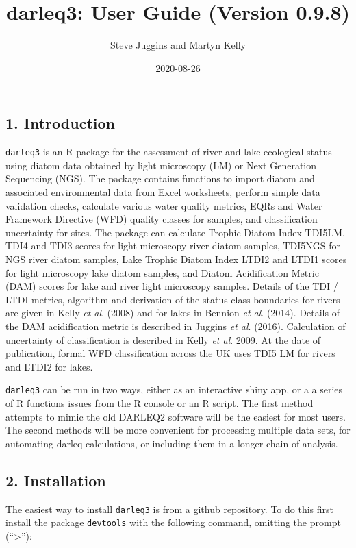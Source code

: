 \documentclass[
]{article}
\title{darleq3: User Guide (Version 0.9.8)}
\author{Steve Juggins and Martyn Kelly}
\date{2020-08-26}
\begin{document}
\maketitle

\hypertarget{introduction}{%
\subsection{1. Introduction}\label{introduction}}

\texttt{darleq3} is an R package for the assessment of river and lake
ecological status using diatom data obtained by light microscopy (LM) or
Next Generation Sequencing (NGS). The package contains functions to
import diatom and associated environmental data from Excel worksheets,
perform simple data validation checks, calculate various water quality
metrics, EQRs and Water Framework Directive (WFD) quality classes for
samples, and classification uncertainty for sites. The package can
calculate Trophic Diatom Index TDI5LM, TDI4 and TDI3 scores for light
microscopy river diatom samples, TDI5NGS for NGS river diatom samples,
Lake Trophic Diatom Index LTDI2 and LTDI1 scores for light microscopy
lake diatom samples, and Diatom Acidification Metric (DAM) scores for
lake and river light microscopy samples. Details of the TDI / LTDI
metrics, algorithm and derivation of the status class boundaries for
rivers are given in Kelly \emph{et al}. (2008) and for lakes in Bennion
\emph{et al}. (2014). Details of the DAM acidification metric is
described in Juggins \emph{et al}. (2016). Calculation of uncertainty of
classification is described in Kelly \emph{et al}. 2009. At the date of
publication, formal WFD classification across the UK uses TDI5 LM for
rivers and LTDI2 for lakes.

\texttt{darleq3} can be run in two ways, either as an interactive shiny
app, or a a series of R functions issues from the R console or an R
script. The first method attempts to mimic the old DARLEQ2 software will
be the easiest for most users. The second methods will be more
convenient for processing multiple data sets, for automating darleq
calculations, or including them in a longer chain of analysis.

\hypertarget{installation}{%
\subsection{2. Installation}\label{installation}}

The easiest way to install \texttt{darleq3} is from a github repository.
To do this first install the package \texttt{devtools} with the
following command, omitting the prompt (``\textgreater{}''):
\end{document}
